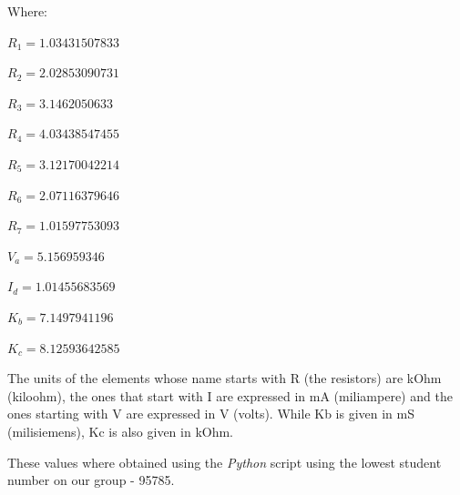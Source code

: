\begin{center}
Where:

$R_1 = 1.03431507833 $

$R_2 = 2.02853090731$
 
$R_3 = 3.1462050633 $

$R_4 = 4.03438547455$ 

$R_5 = 3.12170042214 $

$R_6 = 2.07116379646 $

$R_7 = 1.01597753093 $

$V_a = 5.156959346 $

$I_d = 1.01455683569 $

$K_b = 7.1497941196 $

$K_c = 8.12593642585 $
\end{center}

The units of the elements whose name starts with R (the resistors) are kOhm (kiloohm), the ones that start with I are expressed in mA (miliampere) and the ones starting with V are expressed in V (volts). While Kb is given in mS (milisiemens), Kc is also given in kOhm.

These values where obtained using the \textit{Python} script using the lowest student number on our group - 95785.


